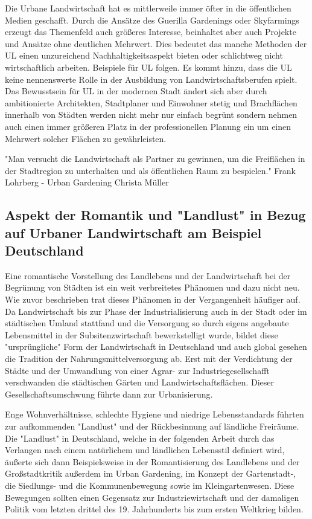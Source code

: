 \documentclass{scrartcl}
\begin{document}
Die Urbane Landwirtschaft hat es mittlerweile immer öfter in die öffentlichen Medien geschafft. Durch die Ansätze des Guerilla Gardenings oder Skyfarmings erzeugt das Themenfeld auch größeres Interesse, beinhaltet aber auch Projekte und Ansätze ohne deutlichen Mehrwert. Dies bedeutet das manche Methoden der UL einen unzureichend Nachhaltigkeitsaspekt bieten oder schlichtweg nicht wirtschaftlich arbeiten. Beispiele für UL folgen. Es kommt hinzu, dass die UL keine nennenswerte Rolle in der Ausbildung von Landwirtschaftsberufen spielt. Das Bewusstsein für UL in der modernen Stadt ändert sich aber durch ambitionierte Architekten, Stadtplaner und Einwohner stetig und Brachflächen innerhalb von Städten werden nicht mehr nur einfach begrünt sondern nehmen auch einen immer größeren Platz in der professionellen Planung ein um einen Mehrwert solcher Flächen zu gewährleisten.

"Man versucht die Landwirtschaft als Partner zu gewinnen, um die Freiflächen in der Stadtregion zu unterhalten und als öffentlichen Raum zu bespielen." Frank Lohrberg - Urban Gardening Christa Müller

\subsection{Aspekt der Romantik und "Landlust" in Bezug auf Urbaner Landwirtschaft am Beispiel Deutschland}

Eine romantische Vorstellung des Landlebens und der Landwirtschaft bei der Begrünung von Städten ist ein weit verbreitetes Phänomen und dazu nicht neu. Wie zuvor beschrieben trat dieses Phänomen in der Vergangenheit häufiger auf. Da Landwirtschaft bis zur Phase der Industrialisierung auch in der Stadt oder im städtischen Umland stattfand und die Versorgung so durch eigens angebaute Lebensmittel in der Subsitenzwirtschaft bewerkstelligt wurde, bildet diese "ursprüngliche" Form der Landwirtschaft in Deutschland und auch global gesehen die Tradition der Nahrungsmittelversorgung ab. Erst mit der Verdichtung der Städte und der Umwandlung von einer Agrar- zur Industriegesellschafft verschwanden die städtischen Gärten und Landwirtschaftsflächen. Dieser Gesellschaftsumschwung führte dann zur Urbanisierung.

Enge Wohnverhältnisse, schlechte Hygiene und niedrige Lebensstandards führten zur aufkommenden "Landlust" und der Rückbesinnung auf ländliche Freiräume. Die "Landlust" in Deutschland, welche in der folgenden Arbeit durch das Verlangen nach einem natürlichem und ländlichen Lebensstil definiert wird, äußerte sich dann Beispielsweise in der Romantisierung des Landlebens und der Großstadtkritik außerdem im Urban Gardening, im Konzept der Gartenstadt-, die Siedlungs- und die Kommunenbewegung sowie im Kleingartenwesen. Diese Bewegungen sollten einen Gegensatz zur Industriewirtschaft und der damaligen Politik vom letzten drittel des 19. Jahrhunderts bis zum ersten Weltkrieg bilden.
\end{document}
